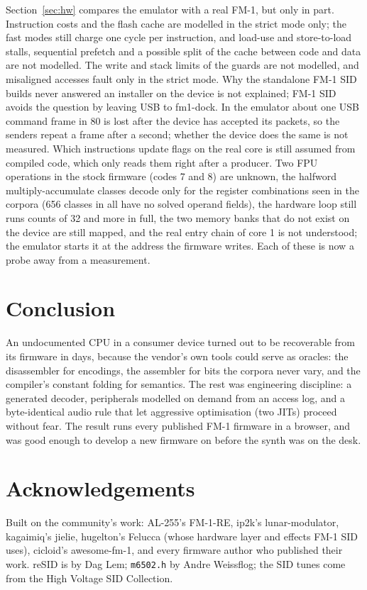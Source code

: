 \documentclass[10pt,a4paper]{article}
\newcommand{\code}[1]{\texttt{#1}}
\begin{document}
Section~\ref{sec:hw} compares the emulator with a real FM-1, but only in part. Instruction costs and
the flash cache are modelled in the strict mode only; the fast modes still charge one cycle per
instruction, and load-use and store-to-load stalls, sequential prefetch and a possible split of the
cache between code and data are not modelled. The write and stack limits of the guards are not
modelled, and misaligned accesses fault only in the strict mode. Why the standalone FM-1 SID builds never
answered an installer on the device is not explained; FM-1 SID avoids the question by leaving USB to
fm1-dock. In the emulator about one USB command frame in 80 is lost after the device has accepted
its packets, so the senders repeat a frame after a second; whether the device does the same is not
measured. Which instructions update flags on the real
core is still assumed from compiled code, which only reads them right after a producer. Two FPU
operations in the stock firmware (codes 7 and 8) are unknown, the halfword multiply-accumulate
classes decode only for the register combinations seen in the corpora (656 classes in all have no
solved operand fields), the hardware loop still runs counts of 32 and more in full, the two memory
banks that do not exist on the device are still mapped, and the real entry chain of
core 1 is not understood; the emulator starts it at the address the firmware writes. Each of these
is now a probe away from a measurement.

\section{Conclusion}

An undocumented CPU in a consumer device turned out to be recoverable from its firmware in days,
because the vendor's own tools could serve as oracles: the disassembler for encodings, the assembler
for bits the corpora never vary, and the compiler's constant folding for semantics. The rest was
engineering discipline: a generated decoder, peripherals modelled on demand from an access log, and a
byte-identical audio rule that let aggressive optimisation (two JITs) proceed without fear. The
result runs every published FM-1 firmware in a browser, and was good enough to develop a new
firmware on before the synth was on the desk.

\section*{Acknowledgements}
Built on the community's work: AL-255's FM-1-RE, ip2k's lunar-modulator, kagaimiq's jielie,
hugelton's Felucca (whose hardware layer and effects FM-1 SID uses), cicloid's awesome-fm-1, and every
firmware author who published their work. reSID is by Dag Lem; \code{m6502.h} by Andre Weissflog;
the SID tunes come from the High Voltage SID Collection.
\end{document}
